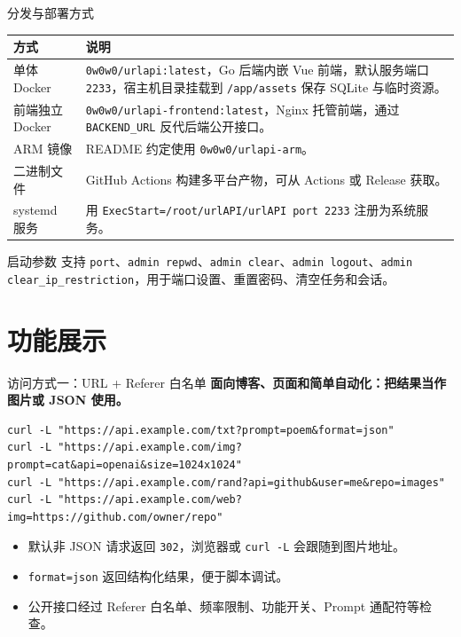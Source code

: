 \documentclass[aspectratio=169,UTF8]{ctexbeamer}
\newcommand{\code}[1]{\texttt{#1}}
\begin{document}
\begin{frame}{分发与部署方式}
  \begin{table}
    \small
    \begin{tabularx}{\linewidth}{lX}
      \toprule
      方式 & 说明 \\
      \midrule
      单体 Docker & \code{0w0w0/urlapi:latest}，Go 后端内嵌 Vue 前端，默认服务端口 \code{2233}，宿主机目录挂载到 \code{/app/assets} 保存 SQLite 与临时资源。 \\
      前端独立 Docker & \code{0w0w0/urlapi-frontend:latest}，Nginx 托管前端，通过 \code{BACKEND\_URL} 反代后端公开接口。 \\
      ARM 镜像 & README 约定使用 \code{0w0w0/urlapi-arm}。 \\
      二进制文件 & GitHub Actions 构建多平台产物，可从 Actions 或 Release 获取。 \\
      systemd 服务 & 用 \code{ExecStart=/root/urlAPI/urlAPI port 2233} 注册为系统服务。 \\
      \bottomrule
    \end{tabularx}
  \end{table}

  \begin{block}{启动参数}
    支持 \code{port}、\code{admin repwd}、\code{admin clear}、\code{admin logout}、\code{admin clear\_ip\_restriction}，用于端口设置、重置密码、清空任务和会话。
  \end{block}
\end{frame}

\section{功能展示}

\begin{frame}[fragile]{访问方式一：URL + Referer 白名单}
  \textbf{面向博客、页面和简单自动化：把结果当作图片或 JSON 使用。}

  \begin{verbatim}
curl -L "https://api.example.com/txt?prompt=poem&format=json"
curl -L "https://api.example.com/img?prompt=cat&api=openai&size=1024x1024"
curl -L "https://api.example.com/rand?api=github&user=me&repo=images"
curl -L "https://api.example.com/web?img=https://github.com/owner/repo"
  \end{verbatim}

  \begin{itemize}
    \item 默认非 JSON 请求返回 \code{302}，浏览器或 \code{curl -L} 会跟随到图片地址。
    \item \code{format=json} 返回结构化结果，便于脚本调试。
    \item 公开接口经过 Referer 白名单、频率限制、功能开关、Prompt 通配符等检查。
  \end{itemize}
\end{frame}
\end{document}

